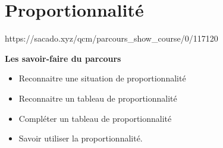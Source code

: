 \chapter{Proportionnalité}
{https://sacado.xyz/qcm/parcours_show_course/0/117120}
{ 

 \begin{CpsCol}
 \textbf{Les savoir-faire du parcours} 
 \begin{itemize}
 \item Reconnaitre une situation de proportionnalité
 \item Reconnaitre un tableau de proportionnalité
 \item Compléter un tableau de proportionnalité
 \item Savoir utiliser la proportionnalité.
 \end{itemize}
 \end{CpsCol}
}
%
%
% 
%
% 
%



